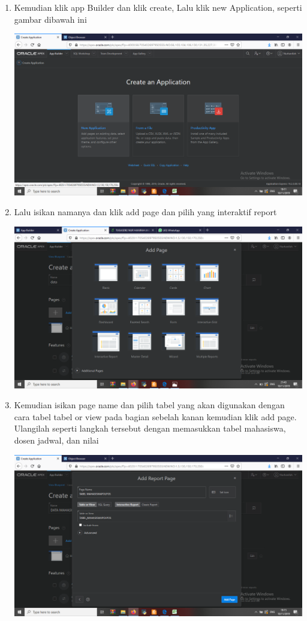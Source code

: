 \begin{enumerate}
    \item Kemudian klik app Builder dan klik create, Lalu klik new Application, seperti gambar dibawah ini
	\begin{center}
    \includegraphics[scale=0.2]{Apex/64.png}
    \end{center}
    
     \item Lalu isikan namanya dan klik add page dan pilih yang interaktif report 
	\begin{center}
    \includegraphics[scale=0.2]{Apex/65.png}
    \end{center}
    
     \item Kemudian isikan page name dan pilih tabel yang akan digunakan dengan cara tabel tabel or view pada bagian sebelah kanan kemudian klik add page. Ulangilah seperti langkah tersebut dengan memasukkan tabel mahasiswa, dosen jadwal, dan nilai
	\begin{center}
    \includegraphics[scale=0.2]{Apex/66.png}
    \end{center}
    

\end{enumerate}
